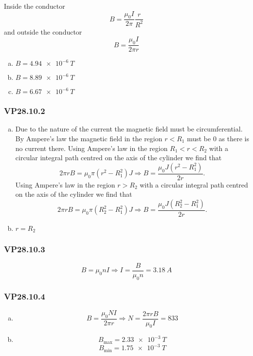 \documentclass{article}
\begin{document}
Inside the conductor \[B = \frac{\mu_0 I}{2 \pi} \frac{r}{R^2}\] and outside the conductor \[B = \frac{\mu_0 I}{2 \pi r}\]

\begin{enumerate}[(a)]
  \item $B = \qty{4.94e-6}{T}$

  \item $B = \qty{8.89e-6}{T}$

  \item $B = \qty{6.67e-6}{T}$
\end{enumerate}

\subsubsection{VP28.10.2}

\begin{enumerate}[(a)]
  \item Due to the nature of the current the magnetic field must be circumferential. By Ampere's law the magnetic field in the region $r < R_1$ must be $0$ as there is no current there. Using Ampere's law in the region $R_1 < r < R_2$ with a circular integral path centred on the axis of the cylinder we find that \[2 \pi r B = \mu_0 \pi (r^2 - R_1^2) J \Rightarrow B = \frac{\mu_0 J (r^2 - R_1^2)}{2 r}.\] Using Ampere's law in the region $r > R_2$ with a circular integral path centred on the axis of the cylinder we find that \[2 \pi r B = \mu_0 \pi (R_2^2 - R_1^2) J \Rightarrow B = \frac{\mu_0 J (R_2^2 - R_1^2)}{2 r}.\]

  \item $r = R_2$
\end{enumerate}

\subsubsection{VP28.10.3}

\[B = \mu_0 n I \Rightarrow I = \frac{B}{\mu_0 n} = \qty{3.18}{A}\]

\subsubsection{VP28.10.4}

\begin{enumerate}[(a)]
  \item \[B = \frac{\mu_0 N I}{2 \pi r} \Rightarrow N = \frac{2 \pi r B}{\mu_0 I} = 833\]

  \item \[B_\textrm{max} = \qty{2.33e-3}{T}\] \[B_\textrm{min} = \qty{1.75e-3}{T}\]
\end{enumerate}
\end{document}
